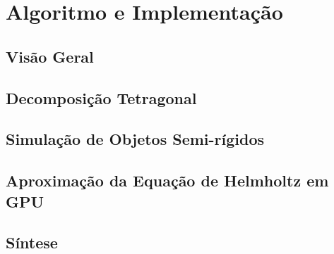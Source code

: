 \chapter{Algoritmo e Implementação}

\section{Visão Geral}

\section {Decomposição Tetragonal}

\section {Simulação de Objetos Semi-rígidos}

\section {Aproximação da Equação de Helmholtz em GPU}

\section {Síntese}
